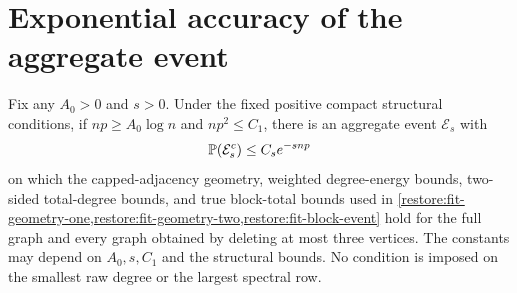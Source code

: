\section{Exponential accuracy of the aggregate event}
\label{sec:high-range}

\begin{lemma}
\label{restore:high-aggregate}
Fix any $A_0>0$ and $s>0$. Under the fixed positive compact structural
conditions, if ${np}\ge A_0\log n$ and $np^2\le C_1$, there is an aggregate
event $\mathcal E_s$ with
\[
 \mathbb P(\mathcal E_s^c)\le C_s e^{-s{np}}
\]
on which the capped-adjacency geometry, weighted degree-energy bounds,
two-sided total-degree bounds, and true block-total bounds used in
\cref{restore:fit-geometry-one,restore:fit-geometry-two,restore:fit-block-event}
hold for the full graph and every graph obtained by deleting at most three
vertices. The constants may depend on $A_0,s,C_1$ and the structural
bounds. No condition is imposed on the smallest raw degree or the
largest spectral row.
\end{lemma}

